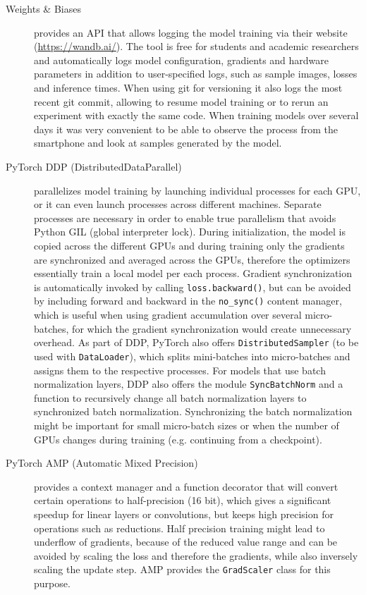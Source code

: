 \begin{description}
    \item[Weights \& Biases] provides an API that allows logging the model training via their website (\hyperlink{www.wandb.ai}{https://wandb.ai/}). The tool is free for students and academic researchers and automatically logs model configuration, gradients and hardware parameters in addition to user-specified logs, such as sample images, losses and inference times. When using git for versioning it also logs the most recent git commit, allowing to resume model training or to rerun an experiment with exactly the same code. When training models over several days it was very convenient to be able to observe the process from the smartphone and look at samples generated by the model.~\autocite{wandb}
    \item[PyTorch DDP (DistributedDataParallel)] parallelizes model training by launching individual processes for each GPU, or it can even launch processes across different machines. Separate processes are necessary in order to enable true parallelism that avoids Python GIL (global interpreter lock). During initialization, the model is copied across the different GPUs and during training only the gradients are synchronized and averaged across the GPUs, therefore the optimizers essentially train a local model per each process. Gradient synchronization is automatically invoked by calling \lstinline{loss.backward()}, but can be avoided by including forward and backward in the \lstinline{no_sync()} content manager, which is useful when using gradient accumulation over several micro-batches, for which the gradient synchronization would create unnecessary overhead. As part of DDP, PyTorch also offers \lstinline{DistributedSampler} (to be used with \lstinline{DataLoader}), which splits mini-batches into micro-batches and assigns them to the respective processes. For models that use batch normalization layers, DDP also offers the module \lstinline{SyncBatchNorm} and a function to recursively change all batch normalization layers to synchronized batch normalization. Synchronizing the batch normalization might be important for small micro-batch sizes or when the number of GPUs changes during training (e.g. continuing from a checkpoint).
    \item[PyTorch AMP (Automatic Mixed Precision)] provides a context manager and a function decorator that will convert certain operations to half-precision (16 bit), which gives a significant speedup for linear layers or convolutions, but keeps high precision for operations such as reductions. Half precision training might lead to underflow of gradients, because of the reduced value range and can be avoided by scaling the loss and therefore the gradients, while also inversely scaling the update step. AMP provides the \lstinline{GradScaler} class for this purpose.
\end{description}